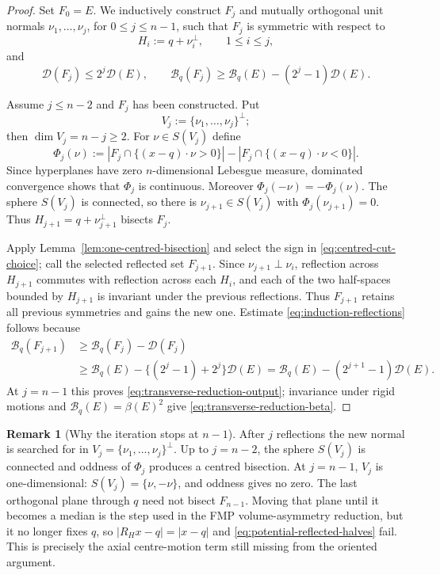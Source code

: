\documentclass[11pt]{amsart}
\theoremstyle{definition}
\newtheorem{remark}[theorem]{Remark}
\newcommand{\Def}{\mathcal D}
\begin{document}
\begin{proof}
Set \(F_0=E\).  We inductively construct \(F_j\) and mutually
orthogonal unit normals \(\nu_1,\ldots,\nu_j\), for
\(0\le j\le n-1\), such that \(F_j\) is symmetric with respect to
\[
   H_i:=q+\nu_i^\perp,\qquad 1\le i\le j,
\]
and
\[
   \Def(F_j)\le2^j\Def(E),
   \qquad
   \mathcal B_q(F_j)
      \ge\mathcal B_q(E)-(2^j-1)\Def(E).
\tag{6.7i}\label{eq:induction-reflections}
\]

Assume \(j\le n-2\) and \(F_j\) has been constructed.  Put
\[
   V_j:=\{\nu_1,\ldots,\nu_j\}^{\perp};
\]
then \(\dim V_j=n-j\ge2\).  For \(\nu\in S(V_j)\) define
\[
   \Phi_j(\nu)
   :=|F_j\cap\{(x-q)\cdot\nu>0\}|
      -|F_j\cap\{(x-q)\cdot\nu<0\}|.
\]
Since hyperplanes have zero \(n\)-dimensional Lebesgue measure,
dominated convergence shows that \(\Phi_j\) is continuous.  Moreover
\(\Phi_j(-\nu)=-\Phi_j(\nu)\).  The sphere \(S(V_j)\) is connected, so
there is \(\nu_{j+1}\in S(V_j)\) with
\(\Phi_j(\nu_{j+1})=0\).  Thus
\(H_{j+1}=q+\nu_{j+1}^{\perp}\) bisects \(F_j\).

Apply Lemma~\ref{lem:one-centred-bisection} and select the sign in
\eqref{eq:centred-cut-choice}; call the selected reflected set
\(F_{j+1}\).  Since \(\nu_{j+1}\perp\nu_i\), reflection across
\(H_{j+1}\) commutes with reflection across each \(H_i\), and each of
the two half-spaces bounded by \(H_{j+1}\) is invariant under the
previous reflections.  Thus \(F_{j+1}\) retains all previous
symmetries and gains the new one.  Estimate
\eqref{eq:induction-reflections} follows because
\[
\begin{aligned}
   \mathcal B_q(F_{j+1})
   &\ge\mathcal B_q(F_j)-\Def(F_j)\\
   &\ge\mathcal B_q(E)
       -\{(2^j-1)+2^j\}\Def(E)
    =\mathcal B_q(E)-(2^{j+1}-1)\Def(E).
\end{aligned}
\]
At \(j=n-1\) this proves
\eqref{eq:transverse-reduction-output}; invariance under rigid motions
and \(\mathcal B_q(E)=\beta(E)^2\) give
\eqref{eq:transverse-reduction-beta}.
\end{proof}

\begin{remark}[Why the iteration stops at \(n-1\)]
\label{rem:last-centred-reflection}
After \(j\) reflections the new normal is searched for in
\(V_j=\{\nu_1,\ldots,\nu_j\}^{\perp}\).  Up to \(j=n-2\), the sphere
\(S(V_j)\) is connected and oddness of \(\Phi_j\) produces a
centred bisection.  At \(j=n-1\), \(V_j\) is one-dimensional:
\(S(V_j)=\{\nu,-\nu\}\), and oddness gives no zero.  The last
orthogonal plane through \(q\) need not bisect \(F_{n-1}\).  Moving
that plane until it becomes a median is the step used in the FMP
volume-asymmetry reduction, but it no longer fixes \(q\), so
\(|R_Hx-q|=|x-q|\) and \eqref{eq:potential-reflected-halves} fail.
This is precisely the axial centre-motion term still missing from the
oriented argument.
\end{remark}
\end{document}
